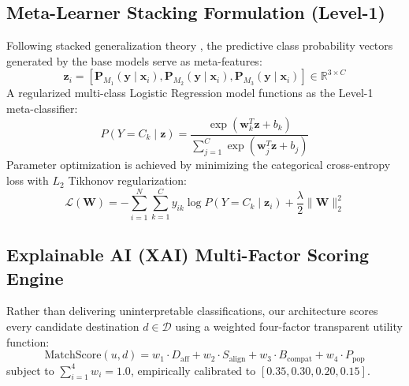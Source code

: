 \documentclass[conference]{IEEEtran}
\begin{document}
\subsection{Meta-Learner Stacking Formulation (Level-1)}
Following stacked generalization theory \cite{wolpert1992stacked, breiman1996stacked}, the predictive class probability vectors generated by the base models serve as meta-features:
\begin{equation}
\mathbf{z}_i = \left[ \mathbf{P}_{M_1}(\mathbf{y} \mid \mathbf{x}_i), \mathbf{P}_{M_2}(\mathbf{y} \mid \mathbf{x}_i), \mathbf{P}_{M_3}(\mathbf{y} \mid \mathbf{x}_i) \right] \in \mathbb{R}^{3 \times C}
\end{equation}
A regularized multi-class Logistic Regression model functions as the Level-1 meta-classifier:
\begin{equation}
P(Y = C_k \mid \mathbf{z}) = \frac{\exp(\mathbf{w}_k^T \mathbf{z} + b_k)}{\sum_{j=1}^C \exp(\mathbf{w}_j^T \mathbf{z} + b_j)}
\end{equation}
Parameter optimization is achieved by minimizing the categorical cross-entropy loss with $L_2$ Tikhonov regularization:
\begin{equation}
\mathcal{L}(\mathbf{W}) = -\sum_{i=1}^N \sum_{k=1}^C y_{ik} \log P(Y = C_k \mid \mathbf{z}_i) + \frac{\lambda}{2} \|\mathbf{W}\|_2^2
\end{equation}

\subsection{Explainable AI (XAI) Multi-Factor Scoring Engine}
Rather than delivering uninterpretable classifications, our architecture scores every candidate destination $d \in \mathcal{D}$ using a weighted four-factor transparent utility function:
\begin{equation}
\text{MatchScore}(u, d) = w_1 \cdot D_{\text{aff}} + w_2 \cdot S_{\text{align}} + w_3 \cdot B_{\text{compat}} + w_4 \cdot P_{\text{pop}}
\label{eq:xai}
\end{equation}
subject to $\sum_{i=1}^4 w_i = 1.0$, empirically calibrated to $[0.35, 0.30, 0.20, 0.15]$.
\end{document}
